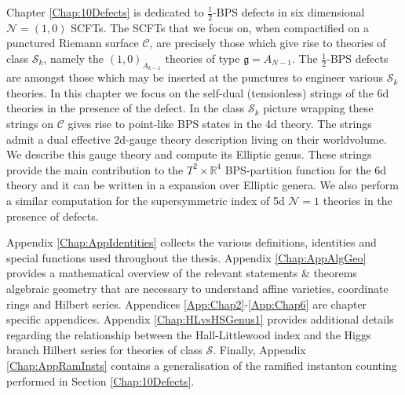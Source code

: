 \documentclass[main.tex]{subfiles}
\begin{document}
Chapter \ref{Chap:10Defects} is dedicated to $\frac{1}{2}$-BPS defects in six dimensional $\mathcal{N}=(1,0)$ SCFTs.  The SCFTs that we focus on, when compactified on a punctured Riemann surface $\mathcal{C}$, are precisely those which give rise to theories of class $\mathcal{S}_k$, namely the $(1,0)_{A_{k-1}}$ theories of type $\mathfrak{g}=A_{N-1}$.   The $\frac{1}{2}$-BPS defects are amongst those which may be inserted at the punctures to engineer various $\mathcal{S}_k$ theories.  In this chapter we focus on the self-dual (tensionless) strings of the 6d theories in the presence of the defect.  In the class $\mathcal{S}_k$ picture wrapping these strings  on $\mathcal{C}$ gives rise to point-like BPS states in the 4d theory.  The strings admit a dual effective 2d-gauge theory description living on their worldvolume.  We describe this gauge theory and compute its Elliptic genus.  These strings provide the main contribution to the $T^2\times\mathbb{R}^4$ BPS-partition function for the 6d theory and it can be written in a expansion over Elliptic genera.  We also perform a similar computation for the supersymmetric index of 5d $\mathcal{N}=1$ theories in the presence of defects.

Appendix \ref{Chap:AppIdentities} collects the various definitions, identities and special functions used throughout the thesis. Appendix \ref{Chap:AppAlgGeo} provides a mathematical overview of the relevant statements \& theorems algebraic geometry that are necessary to understand affine varieties, coordinate rings and Hilbert series. Appendices \ref{App:Chap2}-\ref{App:Chap6} are chapter specific appendices.  Appendix \ref{Chap:HLvsHSGenus1} provides additional details regarding the relationship between the Hall-Littlewood index and the Higgs branch Hilbert series for theories of class $\mathcal{S}$. Finally, Appendix \ref{Chap:AppRamInsts} contains a generalisation of the ramified instanton counting performed in Section \ref{Chap:10Defects}.
\end{document}
